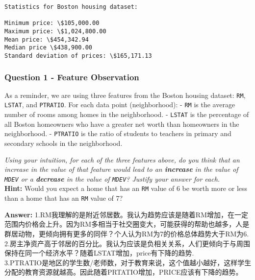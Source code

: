 \documentclass{article}
\begin{document}
    \begin{Verbatim}[commandchars=\\\{\}]
Statistics for Boston housing dataset:

Minimum price: \$105,000.00
Maximum price: \$1,024,800.00
Mean price: \$454,342.94
Median price \$438,900.00
Standard deviation of prices: \$165,171.13
    \end{Verbatim}

    \subsubsection{Question 1 - Feature
Observation}\label{question-1---feature-observation}

As a reminder, we are using three features from the Boston housing
dataset: \texttt{\textquotesingle{}RM\textquotesingle{}},
\texttt{\textquotesingle{}LSTAT\textquotesingle{}}, and
\texttt{\textquotesingle{}PTRATIO\textquotesingle{}}. For each data
point (neighborhood): - \texttt{\textquotesingle{}RM\textquotesingle{}}
is the average number of rooms among homes in the neighborhood. -
\texttt{\textquotesingle{}LSTAT\textquotesingle{}} is the percentage of
all Boston homeowners who have a greater net worth than homeowners in
the neighborhood. - \texttt{\textquotesingle{}PTRATIO\textquotesingle{}}
is the ratio of students to teachers in primary and secondary schools in
the neighborhood.

\emph{Using your intuition, for each of the three features above, do you
think that an increase in the value of that feature would lead to an
\textbf{increase} in the value of
\texttt{\textquotesingle{}MDEV\textquotesingle{}} or a \textbf{decrease}
in the value of \texttt{\textquotesingle{}MDEV\textquotesingle{}}?
Justify your answer for each.}\\
\textbf{Hint:} Would you expect a home that has an
\texttt{\textquotesingle{}RM\textquotesingle{}} value of 6 be worth more
or less than a home that has an
\texttt{\textquotesingle{}RM\textquotesingle{}} value of 7?

    \textbf{Answer: }
1.RM我理解的是附近邻居数。我认为趋势应该是随着RM增加，在一定范围内价格会上升。因为RM多相当于社交圈变大，可能获得的帮助也越多，人是群居动物，更倾向拥有更多的同伴？个人认为RM为7的价格总体趋势大于RM为6.\\
2.房主净资产高于邻居的百分比。我认为应该是负相关关系，人们更倾向于与周围保持在同一个经济水平？随着LSTAT增加，price有下降的趋势.\\
3.PTRATIO是地区的学生数/老师数，对于教育来说，这个值越小越好，这样学生分配的教育资源就越高。因此随着PRTATIO增加，PRICE应该有下降的趋势。
\end{document}
